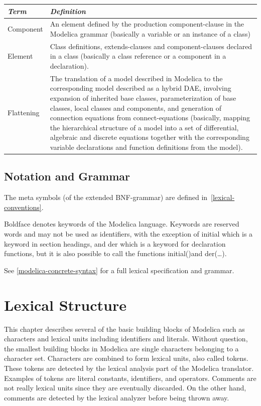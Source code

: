 \documentclass[10pt,a4paper]{report}
\def\doublelabel#1{\label{#1}}
\begin{document}
\begin{tabular}{|l|p{10cm}|}
\hline
\emph{Term} & \emph{Definition} \\
\hline
Component & An element defined by the production
component-clause in the Modelica grammar (basically a
variable or an instance of a class)\\
Element & Class definitions, extends-clauses and
component-clauses declared in a class (basically a class
reference or a component in a declaration).\\
Flattening & The translation of a model described in Modelica to the
corresponding model described as a hybrid DAE, involving expansion of
inherited base classes, parameterization of base classes, local classes
and components, and generation of connection equations from
connect-equations (basically, mapping the hierarchical structure of a
model into a set of differential, algebraic and discrete equations
together with the corresponding variable declarations and function
definitions from the model).\\
\hline
\end{tabular}

\section{Notation and Grammar}\doublelabel{notation-and-grammar}

The meta symbols (of the extended BNF-grammar) are defined in~\ref{lexical-conventions}.

Boldface denotes keywords of the Modelica language. Keywords are
reserved words and may not be used as identifiers, with the exception of
initial which is a keyword in section headings, and der which is a
keyword for declaration functions, but it is also possible to call the
functions initial()and der(\ldots{}).

See \ref{modelica-concrete-syntax} for a full lexical specification and grammar.

\chapter{Lexical Structure}\doublelabel{lexical-structure}

This chapter describes several of the basic building blocks of Modelica
such as characters and lexical units including identifiers and literals.
Without question, the smallest building blocks in Modelica are single
characters belonging to a character set. Characters are combined to form
lexical units, also called tokens. These tokens are detected by the
lexical analysis part of the Modelica translator. Examples of tokens are
literal constants, identifiers, and operators. Comments are not really
lexical units since they are eventually discarded. On the other hand,
comments are detected by the lexical analyzer before being thrown away.
\end{document}
